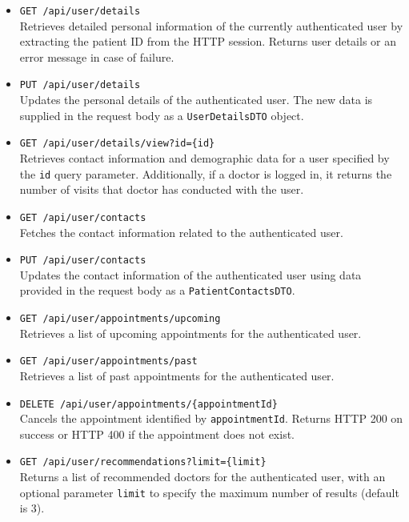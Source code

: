 \begin{itemize}
	\item \texttt{GET /api/user/details} \\
	Retrieves detailed personal information of the currently authenticated user by extracting the patient ID from the HTTP session. Returns user details or an error message in case of failure.
	
	\item \texttt{PUT /api/user/details} \\
	Updates the personal details of the authenticated user. The new data is supplied in the request body as a \texttt{UserDetailsDTO} object.
	
	\item \texttt{GET /api/user/details/view?id=\{id\}} \\
	Retrieves contact information and demographic data for a user specified by the \texttt{id} query parameter. Additionally, if a doctor is logged in, it returns the number of visits that doctor has conducted with the user.
	
	\item \texttt{GET /api/user/contacts} \\
	Fetches the contact information related to the authenticated user.
	
	\item \texttt{PUT /api/user/contacts} \\
	Updates the contact information of the authenticated user using data provided in the request body as a \texttt{PatientContactsDTO}.
	
	\item \texttt{GET /api/user/appointments/upcoming} \\
	Retrieves a list of upcoming appointments for the authenticated user.
	
	\item \texttt{GET /api/user/appointments/past} \\
	Retrieves a list of past appointments for the authenticated user.
	
	\item \texttt{DELETE /api/user/appointments/\{appointmentId\}} \\
	Cancels the appointment identified by \texttt{appointmentId}. Returns HTTP 200 on success or HTTP 400 if the appointment does not exist.
	
	\item \texttt{GET /api/user/recommendations?limit=\{limit\}} \\
	Returns a list of recommended doctors for the authenticated user, with an optional parameter \texttt{limit} to specify the maximum number of results (default is 3).
	

\end{itemize}
